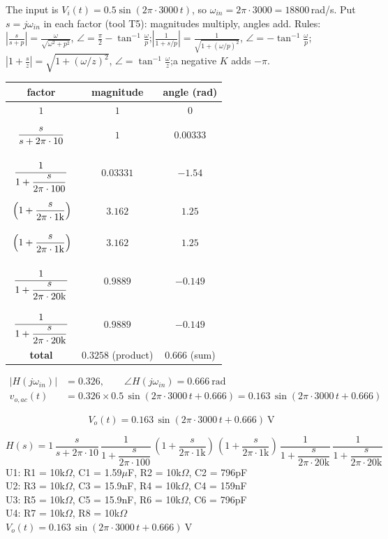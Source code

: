 \documentclass[11pt]{article}
\begin{document}
The input is $V_i(t) = 0.5\sin\left(2\pi\cdot 3000\,t\right)$, so $\omega_{in} = 2\pi\cdot 3000 = 18800$\,rad/s. Put $s=j\omega_{in}$ in each factor (tool T5): magnitudes multiply, angles add.
{\small Rules: $\left|\frac{s}{s+p}\right| = \frac{\omega}{\sqrt{\omega^2+p^2}}$, $\angle = \frac{\pi}{2}-\tan^{-1}\frac{\omega}{p}$;\quad $\left|\frac{1}{1+s/p}\right| = \frac{1}{\sqrt{1+(\omega/p)^2}}$, $\angle = -\tan^{-1}\frac{\omega}{p}$;\quad $\left|1+\frac{s}{z}\right| = \sqrt{1+(\omega/z)^2}$, $\angle = \tan^{-1}\frac{\omega}{z}$;\quad a negative $K$ adds $-\pi$.}
\begin{center}\renewcommand{\arraystretch}{1.35}
\begin{tabular}{ccc}
\toprule
factor & magnitude & angle (rad) \\
\midrule
$1$ & $1$ & $0$ \\
$\rule[-1.1em]{0pt}{2.8em}\dfrac{s}{s+2\pi\cdot 10}$ & $1$ & $0.00333$ \\
$\rule[-1.7em]{0pt}{4em}\dfrac{1}{1+\dfrac{s}{2\pi\cdot 100}}$ & $0.03331$ & $-1.54$ \\
$\rule[-1.1em]{0pt}{2.8em}\left(1+\dfrac{s}{2\pi\cdot 1\mathrm{k}}\right)$ & $3.162$ & $1.25$ \\
$\rule[-1.1em]{0pt}{2.8em}\left(1+\dfrac{s}{2\pi\cdot 1\mathrm{k}}\right)$ & $3.162$ & $1.25$ \\
$\rule[-1.7em]{0pt}{4em}\dfrac{1}{1+\dfrac{s}{2\pi\cdot 20\mathrm{k}}}$ & $0.9889$ & $-0.149$ \\
$\rule[-1.7em]{0pt}{4em}\dfrac{1}{1+\dfrac{s}{2\pi\cdot 20\mathrm{k}}}$ & $0.9889$ & $-0.149$ \\
\textbf{total} & $\mathbf{0.3258}$ (product) & $\mathbf{0.666}$ (sum) \\
\bottomrule
\end{tabular}\end{center}

\begin{align*}
|H(j\omega_{in})| &= 0.326, \qquad \angle H(j\omega_{in}) = 0.666\ \mathrm{rad} \\
v_{o,ac}(t) &= 0.326\times 0.5\,\sin\left(2\pi\cdot 3000\,t + 0.666\right) = 0.163\,\sin\left(2\pi\cdot 3000\,t + 0.666\right)
\end{align*}

\[
\boxed{V_o(t) = 0.163\,\sin\left(2\pi\cdot 3000\,t + 0.666\right)\ \mathrm{V}}
\]

\begin{ansbox}
$H(s) = 1\,\dfrac{s}{s+2\pi\cdot 10}\,\dfrac{1}{1+\dfrac{s}{2\pi\cdot 100}}\,\left(1+\dfrac{s}{2\pi\cdot 1\mathrm{k}}\right)\,\left(1+\dfrac{s}{2\pi\cdot 1\mathrm{k}}\right)\,\dfrac{1}{1+\dfrac{s}{2\pi\cdot 20\mathrm{k}}}\,\dfrac{1}{1+\dfrac{s}{2\pi\cdot 20\mathrm{k}}}$\\[4pt]
U1: R1 = 10k$\Omega$, C1 = 1.59$\mu$F, R2 = 10k$\Omega$, C2 = 796pF\\
U2: R3 = 10k$\Omega$, C3 = 15.9nF, R4 = 10k$\Omega$, C4 = 159nF\\
U3: R5 = 10k$\Omega$, C5 = 15.9nF, R6 = 10k$\Omega$, C6 = 796pF\\
U4: R7 = 10k$\Omega$, R8 = 10k$\Omega$\\[4pt]
$V_o(t) = 0.163\,\sin\left(2\pi\cdot 3000\,t + 0.666\right)\ \mathrm{V}$
\end{ansbox}
\end{document}
